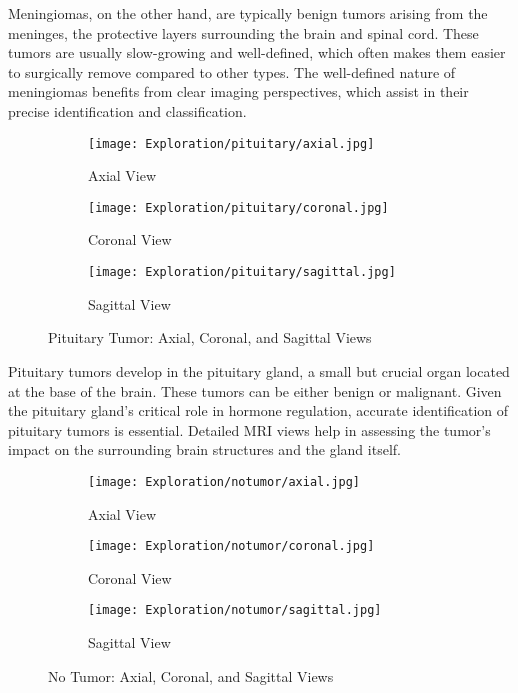 Meningiomas, on the other hand, are typically benign tumors arising from the meninges, the protective layers surrounding the brain and spinal cord. These tumors are usually slow-growing and well-defined, which often makes them easier to surgically remove compared to other types. The well-defined nature of meningiomas benefits from clear imaging perspectives, which assist in their precise identification and classification.

\begin{figure}[H]
  \centering
  \begin{subfigure}[b]{0.2\textwidth}
    \centering
    \texttt{[image: Exploration/pituitary/axial.jpg]}
    \caption{Axial View}
    \label{fig:pituitary_axial}
  \end{subfigure}
  \begin{subfigure}[b]{0.2\textwidth}
    \centering
    \texttt{[image: Exploration/pituitary/coronal.jpg]}
    \caption{Coronal View}
    \label{fig:pituitary_coronal}
  \end{subfigure}
  \begin{subfigure}[b]{0.2\textwidth}
    \centering
    \texttt{[image: Exploration/pituitary/sagittal.jpg]}
    \caption{Sagittal View}
    \label{fig:pituitary_sagittal}
  \end{subfigure}
  \caption{Pituitary Tumor: Axial, Coronal, and Sagittal Views}
  \label{fig:pituitary_views}
\end{figure}

Pituitary tumors develop in the pituitary gland, a small but crucial organ located at the base of the brain. These tumors can be either benign or malignant. Given the pituitary gland's critical role in hormone regulation, accurate identification of pituitary tumors is essential. Detailed MRI views help in assessing the tumor's impact on the surrounding brain structures and the gland itself.

\begin{figure}[H]
  \centering
  \begin{subfigure}[b]{0.2\textwidth}
    \centering
    \texttt{[image: Exploration/notumor/axial.jpg]}
    \caption{Axial View}
    \label{fig:notumor_axial}
  \end{subfigure}
  \begin{subfigure}[b]{0.2\textwidth}
    \centering
    \texttt{[image: Exploration/notumor/coronal.jpg]}
    \caption{Coronal View}
    \label{fig:notumor_coronal}
  \end{subfigure}
  \begin{subfigure}[b]{0.2\textwidth}
    \centering
    \texttt{[image: Exploration/notumor/sagittal.jpg]}
    \caption{Sagittal View}
    \label{fig:notumor_sagittal}
  \end{subfigure}
  \caption{No Tumor: Axial, Coronal, and Sagittal Views}
  \label{fig:notumor_views}
\end{figure}

